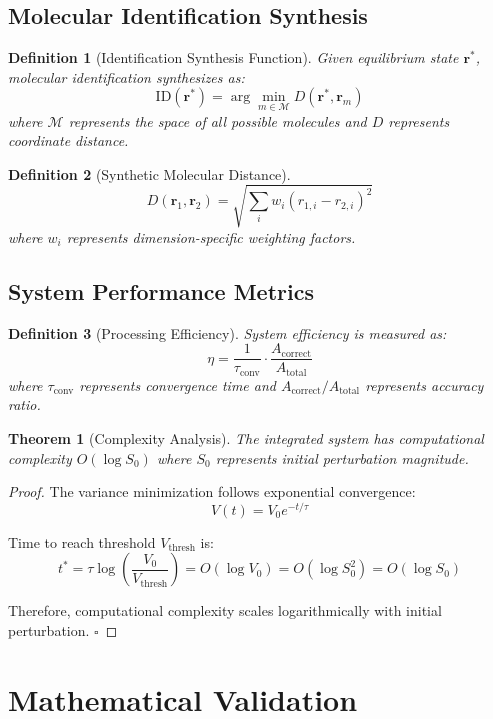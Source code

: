 \documentclass[12pt,a4paper]{article}
\newtheorem{theorem}{Theorem}
\newtheorem{definition}{Definition}
\begin{document}
\subsection{Molecular Identification Synthesis}

\begin{definition}[Identification Synthesis Function]
Given equilibrium state $\mathbf{r}^*$, molecular identification synthesizes as:
$$\text{ID}(\mathbf{r}^*) = \arg\min_{m \in \mathcal{M}} D(\mathbf{r}^*, \mathbf{r}_m)$$
where $\mathcal{M}$ represents the space of all possible molecules and $D$ represents coordinate distance.
\end{definition}

\begin{definition}[Synthetic Molecular Distance]
$$D(\mathbf{r}_1, \mathbf{r}_2) = \sqrt{\sum_{i} w_i (r_{1,i} - r_{2,i})^2}$$
where $w_i$ represents dimension-specific weighting factors.
\end{definition}

\subsection{System Performance Metrics}

\begin{definition}[Processing Efficiency]
System efficiency is measured as:
$$\eta = \frac{1}{\tau_{\text{conv}}} \cdot \frac{A_{\text{correct}}}{A_{\text{total}}}$$
where $\tau_{\text{conv}}$ represents convergence time and $A_{\text{correct}}/A_{\text{total}}$ represents accuracy ratio.
\end{definition}

\begin{theorem}[Complexity Analysis]
The integrated system has computational complexity $O(\log S_0)$ where $S_0$ represents initial perturbation magnitude.
\end{theorem}

\begin{proof}
The variance minimization follows exponential convergence:
$$V(t) = V_0 e^{-t/\tau}$$

Time to reach threshold $V_{\text{thresh}}$ is:
$$t^* = \tau \log\left(\frac{V_0}{V_{\text{thresh}}}\right) = O(\log V_0) = O(\log S_0^2) = O(\log S_0)$$

Therefore, computational complexity scales logarithmically with initial perturbation. $\square$
\end{proof}

\section{Mathematical Validation}
\end{document}
